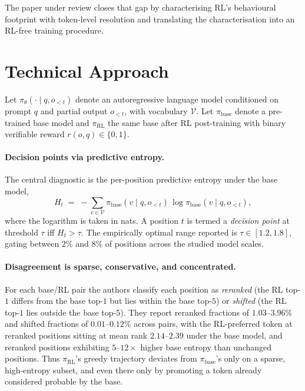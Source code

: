 \documentclass[11pt]{article}
\begin{document}
The paper under review closes that gap by characterising RL's behavioural footprint with token-level resolution and translating the characterisation into an RL-free training procedure.

\section*{Technical Approach}
\label{sec:method}

Let $\pi_{\theta}(\cdot \mid q, o_{<t})$ denote an autoregressive language model conditioned on prompt $q$ and partial output $o_{<t}$, with vocabulary $\mathcal{V}$. Let $\pi_{\text{base}}$ denote a pre-trained base model and $\pi_{\text{RL}}$ the same base after RL post-training with binary verifiable reward $r(o, q) \in \{0, 1\}$.

\paragraph{Decision points via predictive entropy.}
The central diagnostic is the per-position predictive entropy under the base model,
\begin{equation}
H_t \;=\; -\sum_{v \in \mathcal{V}} \pi_{\text{base}}(v \mid q, o_{<t}) \, \log \pi_{\text{base}}(v \mid q, o_{<t}),
\label{eq:entropy}
\end{equation}
where the logarithm is taken in nats. A position $t$ is termed a \emph{decision point} at threshold $\tau$ iff $H_t > \tau$. The empirically optimal range reported is $\tau \in [1.2, 1.8]$, gating between $2\%$ and $8\%$ of positions across the studied model scales.

\paragraph{Disagreement is sparse, conservative, and concentrated.}
For each base/RL pair the authors classify each position as \emph{reranked} (the RL top-$1$ differs from the base top-$1$ but lies within the base top-$5$) or \emph{shifted} (the RL top-$1$ lies outside the base top-$5$). They report reranked fractions of $1.03$--$3.96\%$ and shifted fractions of $0.01$--$0.12\%$ across pairs, with the RL-preferred token at reranked positions sitting at mean rank $2.14$--$2.39$ under the base model, and reranked positions exhibiting $5$--$12\times$ higher base entropy than unchanged positions. Thus $\pi_{\text{RL}}$'s greedy trajectory deviates from $\pi_{\text{base}}$'s only on a sparse, high-entropy subset, and even there only by promoting a token already considered probable by the base.
\end{document}
